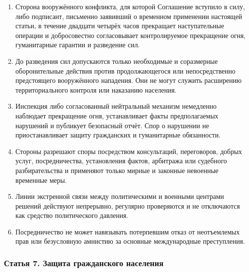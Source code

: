 \documentclass[
  russian,
  11pt,
  a4paper,
]{article}
\providecommand{\tightlist}{%
  \setlength{\itemsep}{0pt}\setlength{\parskip}{0pt}}
\begin{document}
\begin{enumerate}
\def\labelenumi{\arabic{enumi}.}
\tightlist
\item
  Сторона вооружённого конфликта, для которой Соглашение вступило в
  силу, либо подписант, письменно заявивший о временном применении
  настоящей статьи, в течение двадцати четырёх часов прекращает
  наступательные операции и добросовестно согласовывает контролируемое
  прекращение огня, гуманитарные гарантии и разведение сил.
\item
  До разведения сил допускаются только необходимые и соразмерные
  оборонительные действия против продолжающегося или непосредственно
  предстоящего вооружённого нападения. Они не могут служить расширению
  территориального контроля или наказанию населения.
\item
  Инспекция либо согласованный нейтральный механизм немедленно наблюдает
  прекращение огня, устанавливает факты предполагаемых нарушений и
  публикует безопасный отчёт. Спор о нарушении не приостанавливает
  защиту гражданских и гуманитарные обязанности.
\item
  Стороны разрешают споры посредством консультаций, переговоров, добрых
  услуг, посредничества, установления фактов, арбитража или судебного
  разбирательства и применяют только мирные и законные невоенные
  временные меры.
\item
  Линии экстренной связи между политическими и военными центрами решений
  действуют непрерывно, регулярно проверяются и не отключаются как
  средство политического давления.
\item
  Посредничество не может навязывать потерпевшим отказ от неотъемлемых
  прав или безусловную амнистию за основные международные преступления.
\end{enumerate}

\subsubsection{Статья 7. Защита гражданского
населения}\label{ux441ux442ux430ux442ux44cux44f-7-ux437ux430ux449ux438ux442ux430-ux433ux440ux430ux436ux434ux430ux43dux441ux43aux43eux433ux43e-ux43dux430ux441ux435ux43bux435ux43dux438ux44f}
\end{document}
